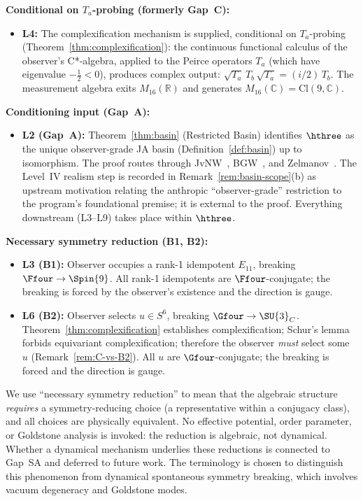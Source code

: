 \medskip
\noindent\textbf{Conditional on $T_a$-probing (formerly Gap~C):}
\begin{itemize}
  \item \textbf{L4:} The complexification mechanism is supplied, conditional on $T_a$-probing
    (Theorem~\ref{thm:complexification}): the continuous functional calculus of the observer's
    C*-algebra, applied to the Peirce operators $T_a$ (which have
    eigenvalue $-\tfrac{1}{2} < 0$), produces complex output:
    $\sqrt{T_a}\,T_b\,\sqrt{T_a} = (i/2)\,T_b$.  The
    measurement algebra exits $M_{16}(\mathbb{R})$ and generates
    $M_{16}(\mathbb{C}) = \mathrm{Cl}(9,\mathbb{C})$.
\end{itemize}

\medskip
\noindent\textbf{Conditioning input (Gap~A):}
\begin{itemize}
  \item \textbf{L2 (Gap~A):} Theorem~\ref{thm:basin} (Restricted
    Basin) identifies $\hthree$ as the unique observer-grade JA
    basin (Definition~\ref{def:basin}) up to isomorphism.  The proof
    routes through JvNW~\cite{JvNW1934}, BGW~\cite{BGW2020}, and
    Zelmanov~\cite{Zelmanov1979}.  The Level~IV realism step is
    recorded in Remark~\ref{rem:basin-scope}(b) as upstream
    motivation relating the anthropic ``observer-grade''
    restriction to the program's foundational premise; it is
    external to the proof.  Everything downstream (L3--L9) takes
    place within $\hthree$.
\end{itemize}

\medskip
\noindent\textbf{Necessary symmetry reduction (B1, B2):}
\begin{itemize}
  \item \textbf{L3 (B1):} Observer occupies a rank-1 idempotent
    $E_{11}$, breaking $\Ffour\to\Spin{9}$.  All rank-1 idempotents
    are $\Ffour$-conjugate; the breaking is forced by the observer's
    existence and the direction is gauge.
  \item \textbf{L6 (B2):} Observer selects $u\in S^6$, breaking
    $\Gfour\to\SU{3}_C$.  Theorem~\ref{thm:complexification}
    establishes complexification; Schur's lemma forbids equivariant
    complexification; therefore the observer \emph{must} select some
    $u$ (Remark~\ref{rem:C-vs-B2}).
    All $u$ are $\Gfour$-conjugate; the breaking is forced and the
    direction is gauge.
\end{itemize}

\noindent
We use ``necessary symmetry reduction'' to mean that the algebraic
structure \emph{requires} a symmetry-reducing choice (a representative
within a conjugacy class), and all choices are physically equivalent.
No effective potential, order parameter, or Goldstone analysis is invoked:
the reduction is algebraic, not dynamical.  Whether a dynamical mechanism
underlies these reductions is connected to Gap~SA and deferred to future
work.  The terminology is chosen to distinguish this phenomenon from
dynamical spontaneous symmetry breaking, which involves vacuum degeneracy
and Goldstone modes.

